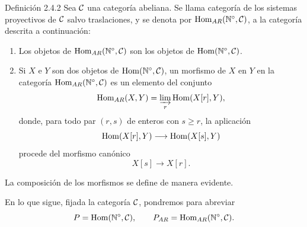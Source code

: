\begin{statement}{Definición 2.4.2}
Sea $\mathcal C$ una categoría abeliana. Se llama categoría de los sistemas proyectivos de $\mathcal C$ salvo traslaciones, y se denota por $\operatorname{Hom}_{AR}(\mathbb N^\circ,\mathcal C)$, a la categoría descrita a continuación:
\begin{enumerate}[label=(\roman*)]
\item Los objetos de $\operatorname{Hom}_{AR}(\mathbb N^\circ,\mathcal C)$ son los objetos de $\operatorname{Hom}(\mathbb N^\circ,\mathcal C)$.
\item Si $X$ e $Y$ son dos objetos de $\operatorname{Hom}(\mathbb N^\circ,\mathcal C)$, un morfismo de $X$ en $Y$ en la categoría $\operatorname{Hom}_{AR}(\mathbb N^\circ,\mathcal C)$ es un elemento del conjunto
\[
\operatorname{Hom}_{AR}(X,Y)=\varinjlim_r\operatorname{Hom}(X[r],Y),
\]
donde, para todo par $(r,s)$ de enteros con $s\ge r$, la aplicación
\[
\operatorname{Hom}(X[r],Y)\longrightarrow\operatorname{Hom}(X[s],Y)
\]
procede del morfismo canónico
\[
X[s]\longrightarrow X[r].
\]
\end{enumerate}
La composición de los morfismos se define de manera evidente.
\end{statement}
En lo que sigue, fijada la categoría $\mathcal C$, pondremos para abreviar
\[
P=\operatorname{Hom}(\mathbb N^\circ,\mathcal C),\qquad P_{AR}=\operatorname{Hom}_{AR}(\mathbb N^\circ,\mathcal C).
\]
